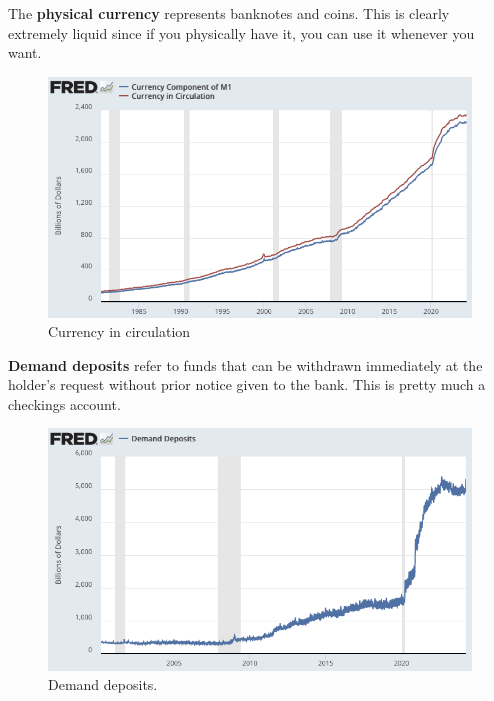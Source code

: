 \documentclass{article}
\begin{document}
    \begin{definition}
      The \textbf{physical currency} represents banknotes and coins. This is clearly extremely liquid since if you physically have it, you can use it whenever you want. 
      \begin{figure}[H]
        \centering 
        \includegraphics[scale=0.4]{img/currency_circulation.png}
        \caption{Currency in circulation} 
        \label{fig:circulation}
      \end{figure}
    \end{definition}

    \begin{definition}
      \textbf{Demand deposits} refer to funds that can be withdrawn immediately at the holder's request without prior notice given to the bank. This is pretty much a checkings account. 
      \begin{figure}[H]
        \centering 
        \includegraphics[scale=0.4]{img/demand_deposit.png}
        \caption{Demand deposits. } 
        \label{fig:demand_deposit}
      \end{figure}
    \end{definition}
\end{document}
